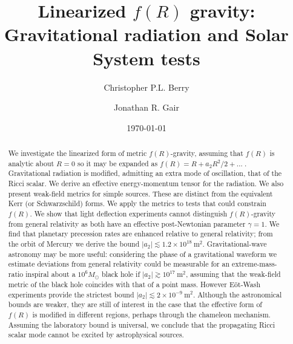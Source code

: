 \documentclass[aps,prd,amsfonts,amssymb,amsmath,nofootinbib,reprint,showpacs]{revtex4-1}
\newcommand{\units}[1]{\ensuremath{~\mathrm{#1}}}
\begin{document}

\title{Linearized $f(R)$ gravity: Gravitational radiation and Solar System tests}

\author{Christopher P.L. Berry}
\author{Jonathan R. Gair}

\date{\today}

\begin{abstract}
We investigate the linearized form of metric $f(R)$-gravity, assuming that $f(R)$ is analytic about $R = 0$ so it may be expanded as $f(R) = R + a_2R^2/2 + \ldots\;$. Gravitational radiation is modified, admitting an extra mode of oscillation, that of the Ricci scalar. We derive an effective energy-momentum tensor for the radiation. We also present weak-field metrics for simple sources. These are distinct from the equivalent Kerr (or Schwarzschild) forms. We apply the metrics to tests that could constrain $f(R)$. We show that light deflection experiments cannot distinguish $f(R)$-gravity from general relativity as both have an effective post-Newtonian parameter $\gamma = 1$. We find that planetary precession rates are enhanced relative to general relativity; from the orbit of Mercury we derive the bound $|a_2| \lesssim 1.2 \times 10^{18}\units{m^2}$. Gravitational-wave astronomy may be more useful: considering the phase of a gravitational waveform we estimate deviations from general relativity could be measurable for an extreme-mass-ratio inspiral about a $10^6 M_\odot$ black hole if $|a_2| \gtrsim 10^{17}\units{m^2}$, assuming that the weak-field metric of the black hole coincides with that of a point mass. However E\"ot-Wash experiments provide the strictest bound $|a_2| \lesssim 2 \times 10^{-9}\units{m^2}$. Although the astronomical bounds are weaker, they are still of interest in the case that the effective form of $f(R)$ is modified in different regions, perhaps through the chameleon mechanism. Assuming the laboratory bound is universal, we conclude that the propagating Ricci scalar mode cannot be excited by astrophysical sources.
\end{abstract}


\maketitle
\end{document}
